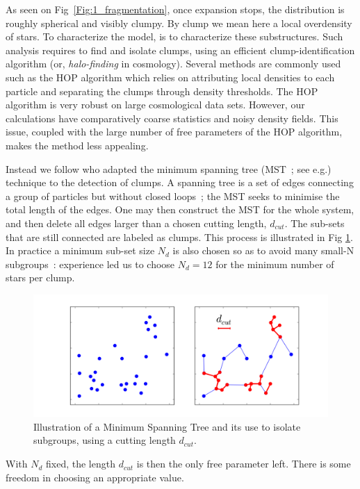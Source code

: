 As seen on Fig~\ref{Fig:1_fragmentation}, once expansion stops, the distribution is roughly spherical and visibly clumpy. By clump we mean here a local overdensity of stars. To characterize the model, is to characterize these substructures. Such analysis requires to find and isolate clumps, using an efficient clump-identification algorithm (or, {\it halo-finding} in cosmology).  Several methods are commonly used such as the HOP algorithm \citep{Eisenstein1998,Skory2010} which relies on attributing local densities to each particle and separating the clumps through density thresholds. The HOP algorithm is very robust on large cosmological data sets. However, our calculations have comparatively coarse statistics and noisy density fields. This issue, coupled with the  large number of free parameters of the HOP algorithm, makes the method less appealing. 

Instead we follow \cite{Maschberger2010} who adapted the minimum spanning tree (MST~; see e.g.\citealt{Allison2009b,Olczak2011}) technique to the detection of clumps. A spanning tree is a set of edges connecting a group of  particles but without closed loops~; the MST seeks to minimise the total length of the edges. One may then construct the MST for the whole system, and then delete all edges larger than a chosen cutting length, $d_{cut}$. The sub-sets that are still connected  are labeled as clumps. This process is illustrated in Fig \ref{Fig:1_MST}. In practice a minimum sub-set size $N_d$  is also chosen so as to avoid many small-N subgroups~: experience led us to choose  $N_d = 12$ for the minimum number of stars per clump. 

\begin{figure}
\begin{center}
\includegraphics[width=0.8\columnwidth]{Figures/1_MST.png}
\end{center}
\caption{Illustration of a Minimum Spanning Tree and its use to isolate subgroups, using a cutting length $d_{cut}$.}
\label{Fig:1_MST}
\end{figure}


With $N_d$ fixed, the length $d_{cut}$ is then the only free parameter left. There is some freedom 
in choosing an appropriate value.
 
